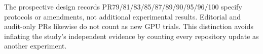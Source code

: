 The prospective design records PR79/81/83/85/87/89/90/95/96/100 specify protocols or amendments, not additional experimental results. Editorial and audit-only PRs likewise do not count as new GPU trials. This distinction avoids inflating the study's independent evidence by counting every repository update as another experiment.

